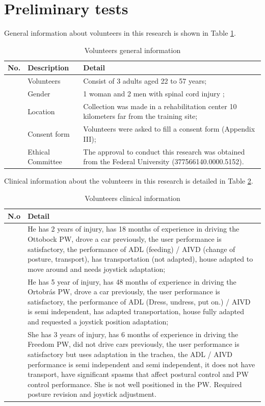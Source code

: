 \section{Preliminary tests}
General information about volunteers in this research is shown in Table \ref{table:tbUserGeneral}.


\begin{table}[!htb]
\caption{Volunteers general information}\label{table:tbUserGeneral}
\centering
\begin{tabular}{ >{\centering}m{0.5cm}  >{}m{3.5cm}  >{}m{10.8cm} }
\toprule
No. & Description & Detail \\
\midrule
1 & Volunteers  	& Consist of 3 adults aged 22 to 57 years;  \\
2 & Gender 		& 1 woman and 2 men with spinal cord injury \cite{rizzo2019, nunnerley2017}; \\
3 & Location 		& Collection was made in a rehabilitation center 10 kilometers far from the training site; \\
4 & Consent form 	& Volunteers were asked to fill a consent form (Appendix III); \\
5 & Ethical Committee 	& The approval to conduct this research was obtained from the Federal University (377566140.0000.5152). \\
\bottomrule
\end{tabular}
\end{table}

Clinical information about the volunteers in this research is detailed in Table \ref{table:tbUserClinical}.

\begin{table}[!htb]
\caption{\label{table:tbUserClinical}Volunteers clinical information}
\centering
\begin{tabular}{ >{\centering}m{0.5cm}  >{}m{14.7cm} }
\toprule
N.o &  Detail \\
\midrule
1 	& He has 2 years of injury, has 18 months of experience in driving the Ottobock PW, drove a car previously, the user performance is satisfactory, the performance of ADL (feeding) / AIVD (change of posture, transport), has transportation (not adapted), house adapted to move around and needs joystick adaptation; \\ \midrule
2 	& He has 5 year of injury, has 48 months of experience in driving the Ortobrás PW, drove a car previously, the user performance is satisfactory, the performance of ADL (Dress, undress, put on.) / AIVD is semi independent, has adapted transportation, house fully adapted and requested a joystick position adaptation; \\ \midrule
3  	& She has 3 years of injury, has 6 months of experience in driving the Freedom PW, did not drive cars previously, the user performance is satisfactory but uses adaptation in the trachea, the ADL / AIVD performance  is semi independent and semi independent, it does not have transport, have significant spasms that affect postural control and PW control performance. She is not well positioned in the PW. Required posture revision and joystick adjustment.  \\ 
\bottomrule
\end{tabular}
\end{table}

